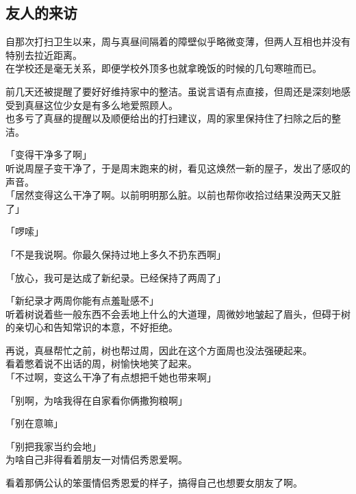 \subsection{友人的来访}

自那次打扫卫生以来，周与真昼间隔着的障壁似乎略微变薄，但两人互相也并没有特别去拉近距离。\\

在学校还是毫无关系，即便学校外顶多也就拿晚饭的时候的几句寒暄而已。

前几天还被提醒了要好好维持家中的整洁。虽说言语有点直接，但周还是深刻地感受到真昼这位少女是有多么地爱照顾人。\\

也多亏了真昼的提醒以及顺便给出的打扫建议，周的家里保持住了扫除之后的整洁。\\

\vspace{2\baselineskip}

「变得干净多了啊」\\

听说周屋子变干净了，于是周末跑来的树，看见这焕然一新的屋子，发出了感叹的声音。\\

「居然变得这么干净了啊。以前明明那么脏。以前也帮你收拾过结果没两天又脏了」

「啰嗦」

「不是我说啊。你最久保持过地上多久不扔东西啊」

「放心，我可是达成了新纪录。已经保持了两周了」

「新纪录才两周你能有点羞耻感不」\\

听着树说着些一般东西不会丢地上什么的大道理，周微妙地皱起了眉头，但碍于树的亲切心和告知常识的本意，不好拒绝。

再说，真昼帮忙之前，树也帮过周，因此在这个方面周也没法强硬起来。\\

看着憋着说不出话的周，树愉快地笑了起来。\\

「不过啊，变这么干净了有点想把千她也带来啊」

「别啊，为啥我得在自家看你俩撒狗粮啊」

「别在意嘛」

「别把我家当约会地」\\

为啥自己非得看着朋友一对情侣秀恩爱啊。

看着那俩公认的笨蛋情侣秀恩爱的样子，搞得自己也想要女朋友了啊。\\

